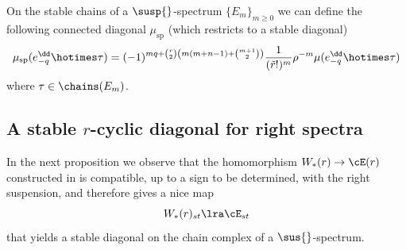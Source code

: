 \begin{corollary}
 On the stable chains of a $\susp{}$-spectrum $\{E_m\}_{m \geq 0}$ we can define the following connected diagonal $\mu_{\mathrm{sp}}$ (which restricts to a stable diagonal)
 \[
 \mu_{\mathrm{sp}}(e_{-q}^\dd \hotimes \tau) = (-1)^{mq+\binom{r}{2}\left(m(m+n-1) + \binom{m+1}{2}\right)}\frac{1}{(\tilde{r}!)^{m}}\rho^{-m} \mu(e_{-q}^\dd \hotimes \tau)
 \]
 where $\tau\in \chains(E_m)$.
\end{corollary}


\subsection{A stable $r$-cyclic diagonal for right spectra} In the next proposition we observe that the homomorphism $W_*(r) \to \cE(r)$ constructed in \cite{medina2021may_st} is compatible, up to a sign to be determined, with the right suspension, and therefore gives a nice map
\[
 W_*(r)_{st} \lra \cE_{st}
\]
that yields a stable diagonal on the chain complex of a $\sus{}$-spectrum.

